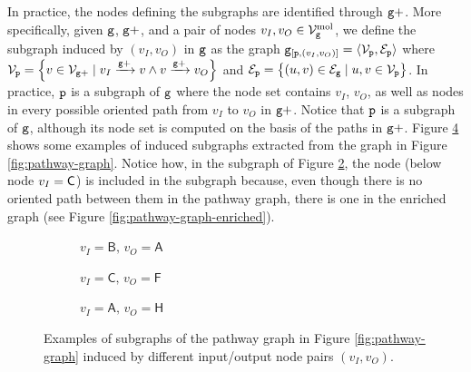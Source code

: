 In practice, the nodes defining the subgraphs are identified through $\mathtt{g+}$. More specifically, given $\mathtt{g}$, $\mathtt{g+}$, and a pair of nodes $v_I, v_O \in \MolNodes{g}$, we define the subgraph induced by $(v_I,v_O)$ in $\mathtt{g}$ as the graph $\InducedSubgraph{g}{\Graph{p}, (v_I,v_O)} = \langle \Nodes{p}, \Edges{p} \rangle$ where $\Nodes{p} = \Set{v \in \Nodes{g+} \mid \Path{v_I}{\Graph{g+}}{v} \wedge \Path{v}{\Graph{g+}}{v_O}}$ and $\Edges{p} = \Set{(u,v) \in \Edges{g} \mid u,v \in \Nodes{p}}$. In practice, $\mathtt{p}$ is a subgraph of $\mathtt{g}$ where the node set contains $v_I$, $v_O$, as well as nodes in every possible oriented path from $v_I$ to $v_O$ in $\mathtt{g+}$. Notice that $\mathtt{p}$ is a subgraph of $\mathtt{g}$, although its node set is computed on the basis of the paths in $\mathtt{g+}$. Figure \ref{fig:subgraphs} shows some examples of induced subgraphs extracted from the graph in Figure \ref{fig:pathway-graph}. Notice how, in the subgraph of Figure \ref{subfig:subgraph2}, the node  (below node $v_I = \mathsf{C}$) is included in the subgraph because, even though there is no oriented path between them in the pathway graph, there is one in the enriched graph (see Figure \ref{fig:pathway-graph-enriched}).
\begin{figure}[h!]
    \begin{subfigure}[b]{0.22\linewidth}
        \centering
        \resizebox{.9\textwidth}{!}{}
        \caption{$v_I=\mathsf{B},\, v_O=\mathsf{A}$}\label{subfig:subgraph1}
    \end{subfigure}
    \begin{subfigure}[b]{0.33\linewidth}
        \centering
        \resizebox{.9\textwidth}{!}{}
        \caption{$v_I=\mathsf{C},\, v_O=\mathsf{F}$}\label{subfig:subgraph2}
    \end{subfigure}
    \begin{subfigure}[b]{0.44\linewidth}
        \centering
        \resizebox{1.\textwidth}{!}{}
        \caption{$v_I=\mathsf{A},\, v_O=\mathsf{H}$}\label{subfig:subgraph3}
    \end{subfigure}
    \caption{Examples of subgraphs of the pathway graph in Figure \ref{fig:pathway-graph} induced by different input/output node pairs $(v_I,v_O)$.}\label{fig:subgraphs}
\end{figure}


